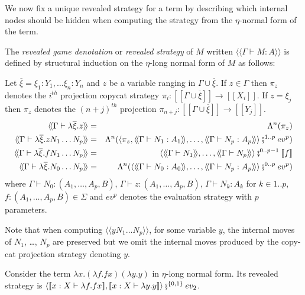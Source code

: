 \documentclass{llncs}
\newcommand{\lsem}{[\![} %
\newcommand{\rsem}{]\!]} %
\newcommand{\sem}[1]{{\lsem #1 \rsem}}
\newcommand{\intersem}[1]{{\langle\!\langle #1 \rangle\!\rangle}}
\newcommand\union{\cup}
\begin{document}
We now fix a unique revealed strategy for a term by describing which internal nodes should be hidden when computing
the strategy from the $\eta$-normal form of the term.
\begin{definition}
\label{dfn:interactionstrategy_ofterms}
The \emph{revealed game denotation} or \emph{revealed
strategy} of $M$ written $\intersem{\Gamma \vdash M : A}$ is defined by structural induction on the $\eta$-long normal form of $M$ as follows:

Let $\overline{\xi} = \xi_1 : Y_1, \ldots \xi_n : Y_n$
and $z$ be a variable ranging in $\Gamma \union \overline{\xi}$. If $z\in \Gamma$ then $\pi_{z}$ denotes
the $i^{th}$ projection copycat strategy $\pi_i : \sem{\Gamma \union \overline{\xi}} \rightarrow \sem{X_i}$. If $z = \xi_j$ then
$\pi_{z}$ denotes the $(n+j)^{th}$ projection $\pi_{n+j} : \sem{\Gamma \union \overline{\xi}} \rightarrow \sem{Y_j}$.
\begin{eqnarray*}
\intersem{\Gamma \vdash \lambda \overline{\xi} . z } &=& \Lambda^n(\pi_{z})  \\
\intersem{\Gamma \vdash \lambda \overline{\xi} . z N_1 \ldots N_p} &=& \Lambda^n(\langle \pi_z, \intersem{\Gamma \vdash N_1 : A_1}, \ldots, \intersem{\Gamma \vdash N_p : A_p}  \rangle \fatsemi ^{1..p} ev^p) \\
\intersem{\Gamma \vdash \lambda \overline{\xi}. f N_1 \ldots N_p} &=& \langle \intersem{\Gamma \vdash N_1}, \ldots, \intersem{\Gamma \vdash N_p} \rangle \fatsemi^{0..p-1} \sem{f} \\
\intersem{\Gamma \vdash \lambda \overline{\xi} . N_0 \ldots N_p} &=& \Lambda^n(\langle \intersem{\Gamma \vdash N_0 : A_0}, \ldots, \intersem{\Gamma \vdash N_p : A_p}  \rangle \fatsemi^{0..p} ev^p)
\end{eqnarray*}
where $\Gamma \vdash N_0 : (A_1,\ldots,A_p,B)$, $\Gamma \vdash z : (A_1,\ldots,A_p,B)$, $\Gamma \vdash N_k : A_k$ for $k\in 1..p$,
$f : (A_1,\ldots,A_p,B) \in \Sigma$ and $ev^p$ denotes the evaluation strategy with $p$ parameters.
\end{definition}
Note that when computing $\intersem{y N_1 \ldots N_p}$, for some variable $y$, the internal moves of $N_1$, \ldots, $N_p$ are preserved but
we omit the internal moves produced by the copy-cat projection strategy denoting $y$.



\begin{example}
Consider the term $\lambda x . (\lambda f . f x) (\lambda y . y)$ in $\eta$-long normal form.
Its revealed strategy is $\langle \sem{ x:X \vdash \lambda f . f
x} , \sem{ x:X \vdash \lambda y . y} \rangle \fatsemi^{\{0,1\}} ev_2$.
\end{example}
\end{document}

